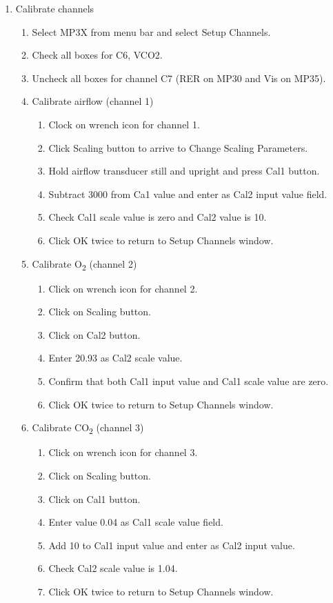 \documentclass{article}
\begin{document}
\begin{enumerate}
	\item Calibrate channels
	\begin{enumerate}
		\item Select MP3X from menu bar and select Setup Channels.
		\item Check all boxes for C6, VCO2.
		\item Uncheck all boxes for channel C7 (RER on MP30 and Vis on MP35).
		\item Calibrate airflow (channel 1)\begin{enumerate}
		\item Clock on wrench icon for channel 1.
		\item Click Scaling button to arrive to Change Scaling Parameters.
		\item Hold airflow transducer still and upright and press Cal1 button.
		\item Subtract 3000 from Ca1 value and enter as Cal2 input value field.
		\item Check Cal1 scale value is zero and Cal2 value is 10.
		\item Click OK twice to return to Setup Channels window.
		\end{enumerate}
		
		\item Calibrate O\textsubscript{2} (channel 2)\begin{enumerate}
			\item Click on wrench icon for channel 2.
			\item Click on Scaling button.
			\item Click on Cal2 button.
			\item Enter 20.93 as Cal2 scale value.
			\item Confirm that both Cal1 input value and Cal1 scale value are zero.
			\item Click OK twice to return to Setup Channels window.
		\end{enumerate}
		
		\item Calibrate CO\textsubscript{2} (channel 3)\begin{enumerate}
			\item Click on wrench icon for channel 3.
			\item Click on Scaling button.
			\item Click on Cal1 button.
			\item Enter value 0.04 as Cal1 scale value field.
			\item Add 10 to Cal1 input value and enter as Cal2 input value.
			\item Check Cal2 scale value is 1.04.
			\item Click OK twice to return to Setup Channels window.
		\end{enumerate}
		

\end{enumerate}
\end{enumerate}
\end{document}
